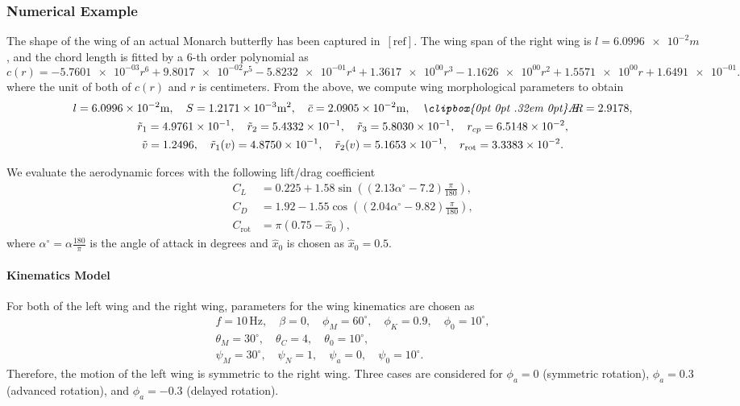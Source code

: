 \documentclass[10pt]{article}
\def\AR{\text{\itshape\clipbox{0pt 0pt .32em 0pt}\AE\kern-.30emR}}
\newcommand{\rot}{\ensuremath{\mathrm{rot}}}
\begin{document}
\subsubsection{Numerical Example}

The shape of the wing of an actual Monarch butterfly has been captured in~$[\mathrm{ref}]$. 
The wing span of the right wing is $l=\num{6.0996e-2}\si{m}$, and
the chord length is fitted by a $6$-th order polynomial as
\[
    c(r) = \num{-5.7601e-03} r^6 + \num{9.8017e-02} r^5 -\num{5.8232e-01} r^4 + \num{1.3617e+00} r^3  - \num{1.1626e+00} r^2  + \num{1.5571e+00} r + \num{1.6491e-01}.
\]
where the unit of both of $c(r)$ and $r$ is centimeters. 
From the above, we compute wing morphological parameters to obtain
\begin{gather*}
    l=\num{6.0996e-2}\si{m},\quad
    S=\num{1.2171e-03}\si{m^2},\quad
    \bar c=\num{2.0905e-02}\si{m},\quad
    \AR = \num{2.9178e+00},\\
    \tilde r_1= \num{4.9761e-01},\quad
    \tilde r_2 = \num{5.4332e-01},\quad
    \tilde r_3 = \num{5.8030e-01},\quad
    r_{cp} = \num{6.5148e-02},\\
    \tilde v = \num{1.2496e+00},\quad
    \tilde r_1(v) = \num{4.8750e-01},\quad
    \tilde r_2(v) = \num{5.1653e-01},\quad
    r_\rot = \num{3.3383e-02}.
\end{gather*}

We evaluate the aerodynamic forces with the following lift/drag coefficient~\cite{sane2002aerodynamic}
\begin{align*}
    C_L & = 0.225 + 1.58 \sin( (2.13\alpha^\circ - 7.2) \frac{\pi}{180}),\\
    C_D & = 1.92 - 1.55 \cos( (2.04 \alpha^\circ - 9.82 ) \frac{\pi}{180}),\\
    C_\rot &  = \pi(0.75 - \hat x_0),
\end{align*}
where $\alpha^\circ = \alpha \frac{180}{\pi}$ is the angle of attack in degrees and $\hat x_0$ is chosen as $\hat x_0=0.5$. 

\paragraph{Kinematics Model~\cite{berman2007energy}}

For both of the left wing and the right wing, parameters for the wing kinematics are chosen as
\begin{gather*}
    f=10\,\mathrm{Hz},\quad \beta=0,\quad \phi_M=60^\circ, \quad \phi_K=0.9, \quad \phi_0 = 10^\circ,\\
    \theta_M = 30^\circ, \quad \theta_C = 4, \quad \theta_0 = 10^\circ,\\
    \psi_M=30^\circ, \quad \psi_N=1, \quad \psi_a=0,\quad \psi_0=10^\circ.
\end{gather*}
Therefore, the motion of the left wing is symmetric to the right wing.
Three cases are considered for $\phi_a=0$ (symmetric rotation), $\phi_a=0.3$ (advanced rotation), and $\phi_a=-0.3$ (delayed rotation).
\end{document}
